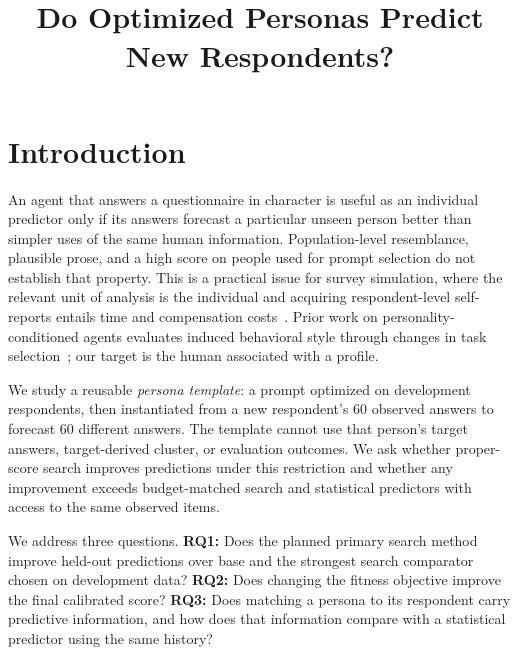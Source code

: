 \documentclass[sigconf,anonymous]{aamas}
\title[Predictive Personas]{Do Optimized Personas Predict New Respondents?}
\begin{document}
\maketitle

\section{Introduction}
An agent that answers a questionnaire in character is useful as an individual
predictor only if its answers forecast a particular unseen person better than
simpler uses of the same human information. Population-level resemblance,
plausible prose, and a high score on people used for prompt selection do not
establish that property. This is a practical issue for survey simulation,
where the relevant unit of analysis is the individual and acquiring
respondent-level self-reports entails time and compensation costs~\cite{park2026selfreports}.
Prior work on personality-conditioned agents evaluates induced behavioral
style through changes in task selection~\cite{newsham2025personality}; our
target is the human associated with a profile.

We study a reusable \emph{persona template}: a prompt optimized on development
respondents, then instantiated from a new respondent's 60 observed answers
to forecast 60 different answers. The template cannot use that person's target
answers, target-derived cluster, or evaluation outcomes. We ask whether
proper-score search improves predictions under this restriction and whether
any improvement exceeds budget-matched search and statistical predictors
with access to the same observed items.

We address three questions. \textbf{RQ1:} Does the planned primary search
method improve held-out predictions over base and the strongest search
comparator chosen on development data? \textbf{RQ2:} Does changing the fitness
objective improve the final calibrated score? \textbf{RQ3:} Does matching a
persona to its respondent carry predictive information, and how does that
information compare with a statistical predictor using the same history?
\end{document}
